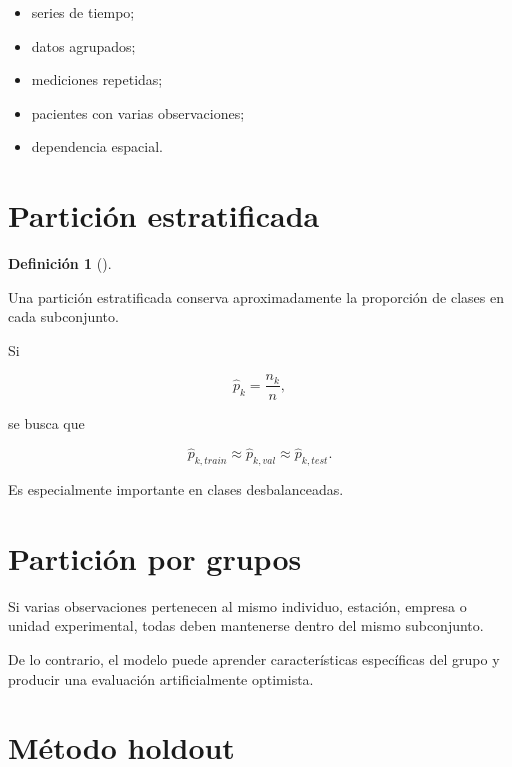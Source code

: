 \documentclass[
  spanish,
  10.5pt,
  letterpaper,
  DIV=11,
  numbers=noendperiod,
  oneside,
  open=any]{scrreprt}
\providecommand{\tightlist}{%
  \setlength{\itemsep}{0pt}\setlength{\parskip}{0pt}}
\theoremstyle{definition}
\newtheorem{definition}{Definición}[chapter]
\theoremstyle{definition}
\theoremstyle{plain}
\theoremstyle{remark}
\begin{document}
\begin{itemize}
\tightlist
\item
  series de tiempo;
\item
  datos agrupados;
\item
  mediciones repetidas;
\item
  pacientes con varias observaciones;
\item
  dependencia espacial.
\end{itemize}

\section*{Partición estratificada}\label{particiuxf3n-estratificada}


\begin{definition}[]\protect\hypertarget{def-particion-estratificada}{}\label{def-particion-estratificada}

Una partición estratificada conserva aproximadamente la proporción de
clases en cada subconjunto.

\end{definition}

Si

\[
\widehat{p}_k
=
\frac{n_k}{n},
\]

se busca que

\[
\widehat{p}_{k,train}
\approx
\widehat{p}_{k,val}
\approx
\widehat{p}_{k,test}.
\]

Es especialmente importante en clases desbalanceadas.

\section*{Partición por grupos}\label{particiuxf3n-por-grupos}


Si varias observaciones pertenecen al mismo individuo, estación, empresa
o unidad experimental, todas deben mantenerse dentro del mismo
subconjunto.

De lo contrario, el modelo puede aprender características específicas
del grupo y producir una evaluación artificialmente optimista.

\section*{Método holdout}\label{muxe9todo-holdout}
\end{document}
